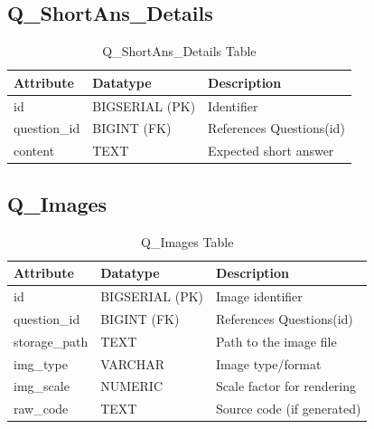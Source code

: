 \documentclass[../report_main.tex]{subfiles}
\begin{document}
\subsection{Q\_ShortAns\_Details}
\begin{table}[H]
\centering
\caption{Q\_ShortAns\_Details Table}
\label{tab:q_shortans_details}
\renewcommand{\arraystretch}{1.25}
\begin{tabular}{|p{3cm}|p{3.5cm}|p{8.5cm}|}
\hline
\textbf{Attribute} & \textbf{Datatype} & \textbf{Description} \\ \hline
id & BIGSERIAL (PK) & Identifier \\ \hline
question\_id & BIGINT (FK) & References Questions(id) \\ \hline
content & TEXT & Expected short answer \\ \hline
\end{tabular}
\end{table}

\subsection{Q\_Images}
\begin{table}[H]
\centering
\caption{Q\_Images Table}
\label{tab:q_images}
\renewcommand{\arraystretch}{1.25}
\begin{tabular}{|p{3cm}|p{3.5cm}|p{8.5cm}|}
\hline
\textbf{Attribute} & \textbf{Datatype} & \textbf{Description} \\ \hline
id & BIGSERIAL (PK) & Image identifier \\ \hline
question\_id & BIGINT (FK) & References Questions(id) \\ \hline
storage\_path & TEXT & Path to the image file \\ \hline
img\_type & VARCHAR & Image type/format \\ \hline
img\_scale & NUMERIC & Scale factor for rendering \\ \hline
raw\_code & TEXT & Source code (if generated) \\ \hline
\end{tabular}
\end{table}
\end{document}
